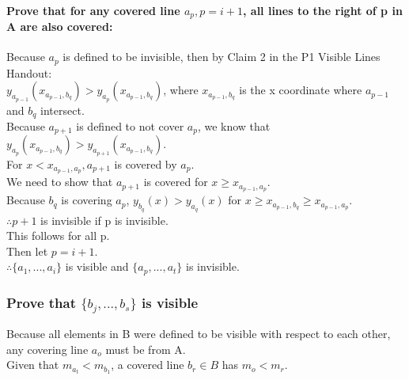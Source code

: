 \documentclass{article}
\begin{document}
    \paragraph{Prove that for any covered line  $a_{p}, p = i + 1$, all lines to the right of p in A are also covered:}
        Because $a_p$ is defined to be invisible, then by Claim 2 in the P1 Visible Lines Handout:\\
        $y_{a_{p-1}}(x_{a_{p-1}, b_{q}}) > y_{a_{p}}(x_{a_{p-1},b_{q}})$, where $x_{a_{p-1}, b_{q}}$ is the x coordinate where $a_{p-1}$ and $b_q$ intersect.\\
        Because $a_{p+1}$ is defined to not cover $a_p$, we know that $y_{a_{p}}(x_{a_{p-1}, b_{q}}) > y_{a_{p+1}}(x_{a_{p-1},b_{q}})$.\\
        For $x < x_{a_{p-1},a_{p}}, a_{p+1}$ is covered by $a_p$.\\
        We need to show that $a_{p+1}$ is covered for $x \geq x_{a_{p-1},a_{p}}$.\\
        Because $b_q$ is covering $a_p$, $y_{b_{q}}(x) > y_{a_{q}}(x)$ for $x \geq x_{a_{p-1},b_{q}} \geq x_{a_{p-1},a_{p}}$.\\
        $\therefore p+1$ is invisible if p is invisible.\\
        This follows for all p.\\
        Then let $p = i + 1$.\\
        $\therefore \{a_1,...,a_i\}$ is visible and $\{a_p,...,a_t\}$ is invisible.\\

\subsubsection*{Prove that $\{b_{j},...,b_{s}\}$ is visible}
    Because all elements in B were defined to be visible with respect to each other, any covering line $a_{o}$ must be from A.\\
    Given that $m_{a_{t}} < m_{b_{1}}$, a covered line $b_{r} \in B$ has $m_{o} < m_{r}$.
    
\end{document}
